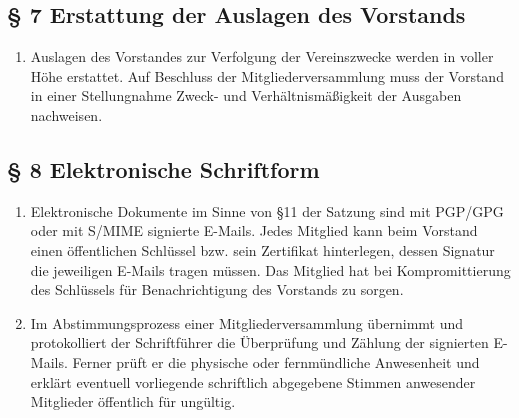 \documentclass[10pt,a4paper]{article}
\begin{document}
\subsection*{§ 7 Erstattung der Auslagen des Vorstands}
\begin{enumerate}
\item Auslagen des Vorstandes zur Verfolgung der Vereinszwecke werden
	in voller Höhe erstattet. Auf Beschluss der Mitgliederversammlung
	muss der Vorstand in einer Stellungnahme Zweck- und Verhältnis\-mäßigkeit
	der Ausgaben nachweisen.
\end{enumerate}
%
%
\subsection*{§ 8 Elektronische Schriftform}
\begin{enumerate}
\item Elektronische Dokumente im Sinne von §11 der Satzung sind mit PGP/GPG
	oder mit S/MIME signierte E-Mails. Jedes Mitglied kann beim Vorstand
	einen öffentlichen Schlüssel bzw. sein Zertifikat hinterlegen, dessen
	Signatur die jeweiligen E-Mails tragen müssen. Das Mitglied hat bei
	Kompromittierung des Schlüssels für Benachrichtigung des Vorstands
	zu sorgen.
\item Im Abstimmungsprozess einer Mitgliederversammlung
	übernimmt und protokolliert der Schriftführer die Überprüfung und
    Zählung der signierten E-Mails. Ferner prüft er die physische oder fernmündliche Anwesenheit und
	erklärt eventuell vorliegende schriftlich abgegebene Stimmen anwesender
	Mitglieder öffentlich für ungültig.
\end{enumerate}

%
%
\end{document}
